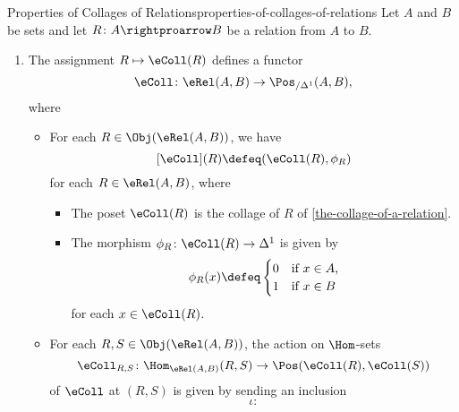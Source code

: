 \begin{proposition}{Properties of Collages of Relations}{properties-of-collages-of-relations}%
    Let $A$ and $B$ be sets and let $R\colon A\rightproarrow B$ be a relation from $A$ to $B$.
    \begin{enumerate}
        \item\label{properties-of-collages-of-relations-functoriality}The assignment $R\mapsto\eColl(R)$ defines a functor%
            \[
                \eColl%
                \colon%
                \eRel(A,B)%
                \to%
                \Pos_{/\Delta^{1}}(A,B),%
            \]%
            where
            \begin{itemize}
                \item{}For each $R\in\Obj(\eRel(A,B))$, we have
                    \[
                        [\eColl](R)
                        \defeq
                        (\eColl(R),\phi_{R})%
                    \]%
                    for each $R\in\eRel(A,B)$, where
                    \begin{itemize}
                        \item The poset $\eColl(R)$ is the collage of $R$ of \cref{the-collage-of-a-relation}.
                        \item The morphism $\phi_{R}\colon\eColl(R)\to\Delta^{1}$ is given by
                            \[
                                \phi_{R}(x)%
                                \defeq
                                \begin{cases}
                                    0 &\text{if $x\in A$,}\\
                                    1 &\text{if $x\in B$}
                                \end{cases}
                            \]%
                            for each $x\in\eColl(R)$.
                    \end{itemize}
                \item{}For each $R,S\in\Obj(\eRel(A,B))$, the action on $\Hom$-sets
                    \[
                        \eColl_{R,S}%
                        \colon%
                        \Hom_{\eRel(A,B)}(R,S)
                        \to
                        \Pos(\eColl(R),\eColl(S))
                    \]%
                    of $\eColl$ at $(R,S)$ is given by sending an inclusion
                    \[
                        \iota%
                        \colon%
\]
\end{itemize}
\end{enumerate}
\end{proposition}
